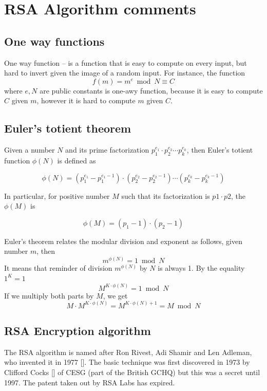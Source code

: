 \chapter{RSA Algorithm comments}\label{ch:rsa-algorithm-comments}


\section{One way functions}\label{sec:one-way-functions}
One way function -- is a function that is easy to compute on every input, but
hard to invert given the image of a random input.
For instance, the function
\begin{equation*}
    f(m) = m^e \bmod N \equiv C
\end{equation*}
where $e, N$ are public constants is one-awy function,
because it is easy to compute $C$ given $m$, however it is hard to compute $m$ given $C$.


\section{Euler's totient theorem}\label{sec:euler's-totient-theorem}
Given a number $N$ and its prime factorization $p_1^{e_1}\cdot p_2^{e_2} \cdots p_k^{e_k}$, then Euler's totient function
$\phi(N)$ is defined as

\[
    \phi(N) = (p_1^{e_1} - p_1^{e_1 - 1}) \cdot (p_2^{e_2} - p_2^{e_2 - 1}) \cdots (p_k^{e_k} - p_k^{e_k - 1})
\]

In particular, for positive number $M$ such that its factorization is $p1 \cdot p2$, the $\phi(M)$ is

\[
    \phi(M) = (p_1 -1) \cdot (p_2 - 1)
\]

Euler's theorem relates the modular division and exponent as follows, given number $m$, then
\[
    m^{\phi(N)} = 1 \bmod N
\]
It means that reminder of division $m^{\phi(N)}$ by $N$ is always 1.
By the equality $1^K = 1$
\[
    M^{K \cdot \phi(N)} = 1 \bmod N
\]
If we multiply both parts by $M$, we get
\[
    M \cdot M^{K \cdot \phi(N)} = M^{K \cdot \phi(N) + 1} = M \bmod N
\]




\section{RSA Encryption algorithm}\label{sec:rsa-encryption-algorithm}
The RSA algorithm is named after Ron Rivest, Adi Shamir and Len Adleman, who invented it in 1977 [\cite{rivest1978method}].
The basic technique was first discovered in 1973 by Clifford Cocks [\cite{cocks1973note}] of CESG (part of the British GCHQ)
but this was a secret until 1997.
The patent taken out by RSA Labs has expired.

